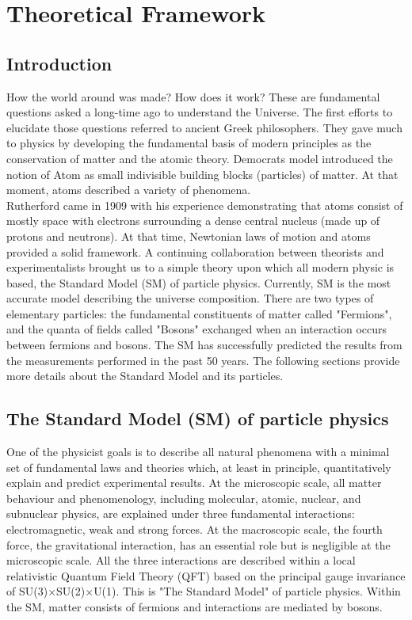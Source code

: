 \newpage
\chapter{Theoretical Framework}
\label{chap1}
\section{Introduction}
\label{chap1:intro}
How the world around was made? How does it work? These are fundamental questions asked a long-time ago to understand the Universe. The first efforts to elucidate those questions referred to ancient Greek philosophers. They gave much to physics by developing the fundamental basis of modern principles as the conservation of matter and the atomic theory. Democrats model introduced the notion of Atom as small indivisible building blocks (particles) of matter. At that moment, atoms described a variety of phenomena. \\
Rutherford came in 1909 with his experience demonstrating that atoms consist of mostly space with electrons surrounding a dense central nucleus (made up of protons and neutrons). At that time, Newtonian laws of motion and atoms provided a solid framework. A continuing collaboration between theorists and experimentalists brought us to a simple theory upon which all modern physic is based, the Standard Model (SM) of particle physics. Currently, SM is the most accurate model describing the universe composition. There are two types of elementary particles: the fundamental constituents of matter called "Fermions", and the quanta of fields called "Bosons" exchanged when an interaction occurs between fermions and bosons. The SM has successfully predicted the results from the measurements performed in the past 50 years. The following sections provide more details about the Standard Model and its particles.

\section{The Standard Model (SM) of particle physics}
\label{chap1:SM}
One of the physicist goals is to describe all natural phenomena with a minimal set of fundamental laws and theories which, at least in principle, quantitatively explain and predict experimental results. At the microscopic scale, all matter behaviour and phenomenology, including molecular, atomic, nuclear, and subnuclear physics, are explained under three fundamental interactions: electromagnetic, weak and strong forces. At the macroscopic scale, the fourth force, the gravitational interaction, has an essential role but is negligible at the microscopic scale. All the three interactions are described within a local relativistic Quantum Field Theory (QFT) based on the principal gauge invariance of SU(3)$\times$SU(2)$\times$U(1). This is "The Standard Model" of particle physics. Within the SM, matter consists of fermions and interactions are mediated by bosons. 

